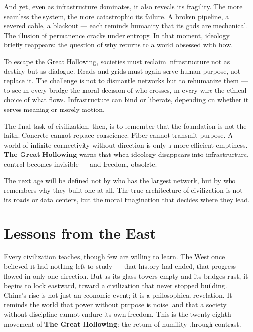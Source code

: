 \documentclass[11pt,twoside]{book}
\begin{document}
And yet, even as infrastructure dominates, it also reveals its fragility.  The more seamless the system, the more catastrophic its failure.  A broken pipeline, a severed cable, a blackout — each reminds humanity that its gods are mechanical.  The illusion of permanence cracks under entropy.  In that moment, ideology briefly reappears: the question of why returns to a world obsessed with how.

To escape the Great Hollowing, societies must reclaim infrastructure not as destiny but as dialogue.  Roads and grids must again serve human purpose, not replace it.  The challenge is not to dismantle networks but to rehumanize them — to see in every bridge the moral decision of who crosses, in every wire the ethical choice of what flows.  Infrastructure can bind or liberate, depending on whether it serves meaning or merely motion.

The final task of civilization, then, is to remember that the foundation is not the faith.  Concrete cannot replace conscience.  Fiber cannot transmit purpose.  A world of infinite connectivity without direction is only a more efficient emptiness.  \textbf{The Great Hollowing} warns that when ideology disappears into infrastructure, control becomes invisible — and freedom, obsolete.

The next age will be defined not by who has the largest network, but by who remembers why they built one at all.  
The true architecture of civilization is not its roads or data centers, but the moral imagination that decides where they lead.

% 
\chapter{Lessons from the East}
\label{ch:28}

Every civilization teaches, though few are willing to learn.  
The West once believed it had nothing left to study — that history had ended, that progress flowed in only one direction.  
But as its glass towers empty and its bridges rust, it begins to look eastward, toward a civilization that never stopped building.  
China’s rise is not just an economic event; it is a philosophical revelation.  
It reminds the world that power without purpose is noise, and that a society without discipline cannot endure its own freedom.  
This is the twenty-eighth movement of \textbf{The Great Hollowing}: the return of humility through contrast.
\end{document}
